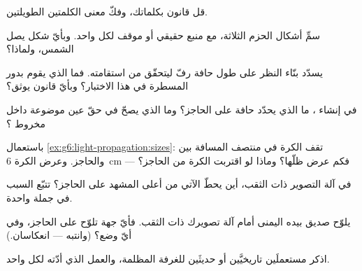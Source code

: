 \begin{exercise}[$\star$]\label{exo:g6:light-propagation:1}
قل قانون  بكلماتك، وفكّ معنى الكلمتين
الطويلتين.
\end{exercise}

\begin{exercise}[$\star$]\label{exo:g6:light-propagation:2}
سمِّ أشكال الحزم الثلاثة، مع منبع حقيقي أو موقف لكل واحد. وبأيّ
شكل يصل  الشمس، ولماذا؟
\end{exercise}

\begin{exercise}[$\star$]\label{exo:g6:light-propagation:3}
يسدّد بنّاء النظر على طول حافة رفّ ليتحقّق من استقامته. فما الذي
يقوم بدور المسطرة في هذا الاختبار؟ وبأيّ قانون يوثق؟
\end{exercise}

\begin{exercise}[$\star$]\label{exo:g6:light-propagation:4}
في إنشاء ، ما الذي يحدّد حافة  على الحاجز؟ وما الذي
يصحّ في حقّ عين موضوعة داخل مخروط ؟
\end{exercise}

\begin{exercise}[$\star$]\label{exo:g6:light-propagation:5}
باستعمال \cref{ex:g6:light-propagation:sizes}: تقف الكرة في
منتصف المسافة بين  والحاجز. وعرض الكرة \qty{6}{cm} ---
فكم عرض ظلّها؟ وماذا لو اقتربت الكرة من الحاجز؟
\end{exercise}

\begin{exercise}[$\star$]\label{exo:g6:light-propagation:6}
في آلة التصوير ذات الثقب، أين يحطّ  الآتي من أعلى المشهد
على الحاجز؟ تتبّع السبب في جملة واحدة.
\end{exercise}

\begin{exercise}[$\star$]\label{exo:g6:light-propagation:7}
يلوّح صديق بيده اليمنى أمام آلة تصويرك ذات الثقب. فأيّ جهة
تلوّح على الحاجز، وفي أيّ وضع؟ (وانتبه --- انعكاسان.)
\end{exercise}

\begin{exercise}[$\star$]\label{exo:g6:light-propagation:8}
اذكر مستعملَين تاريخيَّين أو حديثَين للغرفة المظلمة، والعمل
الذي أدّته لكل واحد.
\end{exercise}

